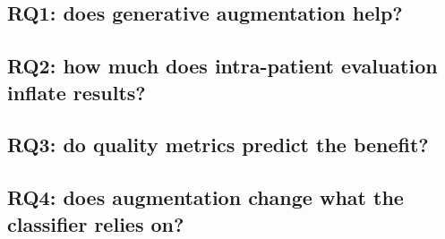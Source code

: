 \documentclass[11pt]{article}
\begin{document}
\subsection{RQ1: does generative augmentation help?}

\begin{table}[htbp]\centering\small{}\caption{Test results per condition (95\% record-level CI).}\label{tab:test}\end{table}
\begin{table}[htbp]\centering\small{}\caption{Pre-registered comparisons (unadjusted 95\% CI, Holm-adjusted $p$).}\label{tab:comparisons}\end{table}

\subsection{RQ2: how much does intra-patient evaluation inflate results?}

\begin{table}[htbp]\centering\small{}\caption{Rare-class macro-F1 of the cnn when the same pipeline is evaluated on a random beat-level split of DS1 and DS2 (intra-patient) and on DS2 (inter-patient). Run after the final evaluation; never used for any decision.}\label{tab:audit}\end{table}

\subsection{RQ3: do quality metrics predict the benefit?}

\begin{table}[htbp]\centering\small{}\caption{Quality metrics against the downstream gain across generator checkpoints (exploratory; TSTR analysed apart).}\label{tab:rq3}\end{table}

\subsection{RQ4: does augmentation change what the classifier relies on?}

\begin{table}[htbp]\centering\small{}\caption{Saliency methods: faithfulness gain over random deletion and stability across seeds.}\label{tab:explain}\end{table}
\end{document}
